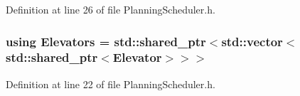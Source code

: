 Definition at line 26 of file Planning\+Scheduler.\+h.

\subsubsection[{Elevators}]{\setlength{\rightskip}{0pt plus 5cm}using {\bf Elevators} =  std\+::shared\+\_\+ptr$<$std\+::vector$<$std\+::shared\+\_\+ptr$<${\bf Elevator}$>$$>$$>$}\label{_planning_scheduler_8h_ada596e1236f7c5acbdefe18bd70f1243}


Definition at line 22 of file Planning\+Scheduler.\+h.

